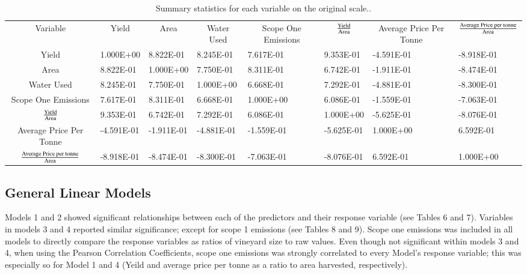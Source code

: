 \documentclass[review,12pt,authoryear]{elsarticle}
\begin{document}
\begin{linenumbers}
    \begin{table}[]
      \caption{Summary statistics for each variable on the original scale..}
      \label{tab:tab5}
      \begin{tabular}{clllllll}
      Variable &
        \multicolumn{1}{c}{Yield} &
        \multicolumn{1}{c}{Area} &
        \multicolumn{1}{c}{Water Used} &
        \multicolumn{1}{c}{Scope One Emissions} &
        \multicolumn{1}{c}{$\textrm{Yield}\over\textrm{Area}$} &
        \multicolumn{1}{c}{Average Price Per Tonne} &
        \multicolumn{1}{c}{${\textrm{Average Price per tonne}\over\textrm{Area}}$} \\
      Yield                                              & 1.000E+00  & 8.822E-01  & 8.245E-01  & 7.617E-01  & 9.353E-01  & -4.591E-01 & -8.918E-01 \\
      Area                                               & 8.822E-01  & 1.000E+00  & 7.750E-01  & 8.311E-01  & 6.742E-01  & -1.911E-01 & -8.474E-01 \\
      Water Used                                         & 8.245E-01  & 7.750E-01  & 1.000E+00  & 6.668E-01  & 7.292E-01  & -4.881E-01 & -8.300E-01 \\
      Scope One Emissions                                & 7.617E-01  & 8.311E-01  & 6.668E-01  & 1.000E+00  & 6.086E-01  & -1.559E-01 & -7.063E-01 \\
      $\textrm{Yield}\over\textrm{Area}$                     & 9.353E-01  & 6.742E-01  & 7.292E-01  & 6.086E-01  & 1.000E+00  & -5.625E-01 & -8.076E-01 \\
      Average Price Per Tonne                            & -4.591E-01 & -1.911E-01 & -4.881E-01 & -1.559E-01 & -5.625E-01 & 1.000E+00  & 6.592E-01  \\
      ${\textrm{Average Price per tonne}\over\textrm{Area}}$ & -8.918E-01 & -8.474E-01 & -8.300E-01 & -7.063E-01 & -8.076E-01 & 6.592E-01  & 1.000E+00 
      \end{tabular}
      \end{table}

\subsection{General Linear Models}
Models 1 and 2 showed significant relationships between each of the predictors and their response variable (see Tables 6 and 7). Variables in models 3 and 4 reported similar significance; except for scope 1 emissions (see Tables 8 and 9). Scope one emissions was included in all models to directly compare the response variables as ratios of vineyard size to raw values. Even though not significant within models 3 and 4, when using the Pearson Correlation Coefficients, scope one emissions was strongly correlated to every Model's response variable; this was especially so for Model 1 and 4 (Yeild and average price per tonne as a ratio to area harvested, respectively).


\end{linenumbers}
\end{document}

